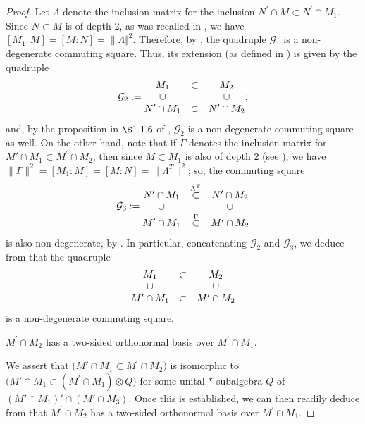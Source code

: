 \documentclass{amsart}
\theoremstyle{definition}
\theoremstyle{theorem}
\begin{document}
\begin{proof}
Let $\Lambda$ denote the inclusion matrix for the inclusion
$N^{\prime}\cap M\subset N^{\prime}\cap M_1$. Since $N\subset M$ is of
depth $2$, as was recalled in , we have
$[M_1:M]=[M:N]= {\lVert \Lambda\Vert}^2.$ Therefore, by
, the quadruple $\mathcal{G}_1$ is a
non-degenerate commuting square. Thus, its extension (as defined in
\cite[$\S 1.1.6$]{pop2}) is given by the quadruple
\[
\mathcal{G}_2:=\begin{matrix}
  M_1 &\subset & M_2 \cr \cup &\ &\cup\cr N^{\prime}\cap M_1 &\subset & N^{\prime}\cap M_2
\end{matrix};
\]
and, by the proposition in $\S 1.1.6$ of \cite{pop2}, $\mathcal{G}_2$
is a non-degenerate commuting square as well. On the other hand, note
that if $\Gamma$ denotes the inclusion matrix for $M'\cap M_1 \subset
M^{\prime}\cap M_2$, then since $M \subset M_1$ is also of depth $2$
(see ), we have $\|\Gamma\|^2 = [M_1:M]= [M:N]=\|\Lambda^T
\|^2$; so, the commuting square
\[
\mathcal{G}_3:=\begin{matrix} N^{\prime}\cap M_1 &\stackrel{\Lambda^T}{\subset} &
N^{\prime}\cap M_2 \cr \cup &\ &\cup\cr M^{\prime}\cap M_1 &\stackrel{\Gamma}{\subset} &
M^{\prime}\cap M_2
\end{matrix}
\]
is also non-degenerate,  by . In particular,
concatenating $\mathcal{G}_2$ and $\mathcal{G}_3$, we deduce from
\cite[$\S 1.1.5$]{pop2} that the quadruple
$$
\begin{matrix}
  M_1 &\subset & M_2 \cr \cup &\ &\cup\cr M^{\prime}\cap M_1 &\subset & M^{\prime}\cap M_2
\end{matrix}
$$
is  a non-degenerate commuting square.
\medskip

 $M^{\prime}\cap M_2$ has a two-sided orthonormal basis
over $M^{\prime}\cap M_1$. \medskip

We assert that $\big( M'\cap M_1 \subset M^{\prime}\cap M_2\big)$ is
isomorphic to $\Big( M'\cap M_1 \subset (M^{\prime}\cap M_1) \otimes Q
\Big)$ for some unital $*$-subalgebra $Q$ of $(M'\cap M_1)' \cap
(M'\cap M_3)$. Once this is established, we can then readily deduce
from  that $M^{\prime}\cap M_2$ has a
two-sided orthonormal basis over $M^{\prime}\cap M_1$.


\end{proof}
\end{document}
